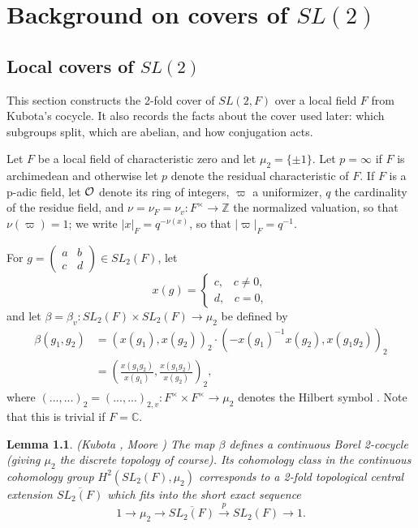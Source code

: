 \documentclass[12pt,letterpaper,openany]{book}
\theoremstyle{plain}
\newtheorem{lemma}[theorem]{Lemma}
\theoremstyle{definition}
\theoremstyle{remark}
\theoremstyle{remark}
\begin{document}
\chapter{Background on covers of \texorpdfstring{$SL(2)$}{SL(2)}}\label{ch:background}

\section{Local covers of \texorpdfstring{$SL(2)$}{SL(2)}}\label{sec:local}

This section constructs the 2-fold cover of $SL(2,F)$ over a local field $F$ from Kubota's cocycle. It also records the facts about the cover used later: which subgroups split, which are abelian, and how conjugation acts.


Let $F$ be a local field of characteristic zero and let $\mu_2=\{\pm 1\}$.
Let $p=\infty$ if $F$ is archimedean and otherwise
let $p$ denote the residual characteristic of $F$.
If $F$ is a p-adic field, let ${\cal O}$ denote its ring of integers,
$\varpi$ a uniformizer, $q$ the cardinality of the residue field, and
$\nu =\nu _F=\nu _v:F^{\times }\rightarrow {\mathbb{Z}}$ the
normalized valuation, so that $\nu (\varpi )=1$; we write
$|x|_F=q^{-\nu(x)}$, so that $|\varpi|_F=q^{-1}$.


For $g=\left(
\begin{array}{cc}
a & b \\
c & d
\end{array}
\right) \in SL_2(F)$, let
\[
x(g)=\left\{
\begin{array}{c}
c,\;\;\;c\neq 0, \\
d,\;\;\;c=0,
\end{array}
\right.
\]
and let $\beta =\beta _v:SL_2(F)\times SL_2(F)\rightarrow \mu _2$ be defined
by
\begin{align}
\beta (g_1,g_2) &=(x(g_1),x(g_2))_2\cdot (-x(g_1)^{-1}x(g_2),x(g_1g_2))_2 \label{eq:beta}\\
&=(\frac{x(g_1g_2)}{x(g_1)},\frac{x(g_1g_2)}{x(g_2)})_2,  \nonumber
\end{align}
where $(...,...)_2=(...,...)_{2,v}:F^{\times }
\times F^{\times }\rightarrow \mu _2$
denotes the Hilbert symbol \cite{W1}.
Note that this is trivial if $F={\mathbb {C}}$.

\begin{lemma}\label{lem:kubota}
(Kubota \cite{K1}, Moore \cite{M})
The map $\beta $ defines a continuous Borel
2-cocycle (giving $\mu _2$ the discrete topology of course). Its cohomology
class in the continuous cohomology group $H^2(SL_2(F),\mu _2)$ corresponds
to a 2-fold topological central extension $\overline{SL_2(F)}$ which fits
into the short exact sequence
\[
1\rightarrow \mu _2\rightarrow \overline{SL_2(F)}\stackrel{p}{\rightarrow }%
SL_2(F)\rightarrow 1.
\]
\end{lemma}
\end{document}
